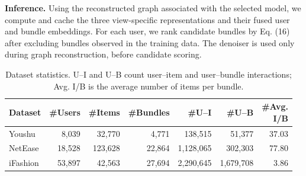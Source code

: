 \documentclass[letterpaper]{article}
\begin{document}
\textbf{Inference.} Using the reconstructed graph associated with the selected model, we compute and cache the three view-specific representations and their fused user and bundle embeddings. For each user, we rank candidate bundles by Eq. (16) after excluding bundles observed in the training data. The denoiser is used only during graph reconstruction, before candidate scoring.

\begin{table}[!b]
    \centering
    {\small
    \setlength{\tabcolsep}{2pt}
    \begin{tabular}{@{}lrrrrrr@{}}
        \toprule
        Dataset
        & \#Users
        & \#Items
        & \#Bundles
        & \#U--I
        & \#U--B
        & \shortstack{\#Avg.\\I/B} \\
        \midrule
        Youshu
        & 8,039
        & 32,770
        & 4,771
        & 138,515
        & 51,377
        & 37.03 \\
        NetEase
        & 18,528
        & 123,628
        & 22,864
        & 1,128,065
        & 302,303
        & 77.80 \\
        iFashion
        & 53,897
        & 42,563
        & 27,694
        & 2,290,645
        & 1,679,708
        & 3.86 \\
        \bottomrule
    \end{tabular}
    }

    \caption{Dataset statistics. U--I and U--B count user--item
    and user--bundle interactions; Avg. I/B is the average
    number of items per bundle.}
    \label{tab:datasets}
\end{table}
\end{document}
